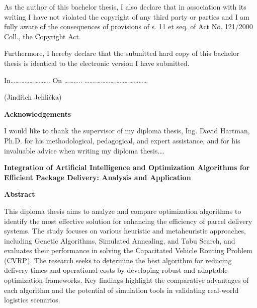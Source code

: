 \documentclass{article}
\begin{document}
    As the author of this bachelor thesis, I also declare that in association with its writing I have not violated the copyright of any third party or parties and I am fully aware of the consequences of provisions of s. 11 et seq. of Act No. 121/2000 Coll., the Copyright Act.

    Furthermore, I hereby declare that the submitted hard copy of this bachelor thesis is identical to the electronic version I have submitted.

    In\ldots\ldots\ldots\ldots\ldots\ldots\ldots\ldots. On
    \ldots\ldots\ldots..
    \ldots\ldots.\ldots\ldots\ldots\ldots\ldots\ldots\ldots\ldots\ldots\ldots\ldots{}

    (Jindřich Jehlička)

    \newpage
    \thispagestyle{empty}

    \vspace*{\fill}


    \textbf{Acknowledgements}

    I would like to thank the supervisor of my diploma thesis, Ing. David Hartman, Ph.D. for his methodological, pedagogical, and expert assistance, and for his invaluable advice when writing my diploma thesis.\ldots{}


    \newpage


    \begin{center}
        \textbf{\Large Integration of Artificial Intelligence and Optimization Algorithms for Efficient Package Delivery: Analysis and Application}
    \end{center}



    \vspace*{\fill}

    \textbf{Abstract}

    This diploma thesis aims to analyze and compare optimization algorithms to identify the most effective solution for enhancing the efficiency of parcel delivery systems.
    The study focuses on various heuristic and metaheuristic approaches, including Genetic Algorithms, Simulated Annealing, and Tabu Search, and evaluates their performance in solving the Capacitated Vehicle Routing Problem (CVRP). The research seeks to determine the best algorithm for reducing delivery times and operational costs by developing robust and adaptable optimization frameworks. Key findings highlight the comparative advantages of each algorithm and the potential of simulation tools in validating real-world logistics scenarios.
\end{document}
